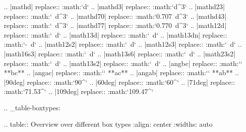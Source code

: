 .. |mathd| replace:: :math:`d`
.. |mathd3| replace:: :math:`d^{3}`
.. |mathd23| replace:: :math:`~d^{3}`
.. |mathd70| replace:: :math:`0.707~d^{3}`
.. |mathd43| replace:: :math:`~d^{3}`
.. |mathd77| replace:: :math:`0.770~d^{3}`
.. |math12d| replace:: :math:`~d`
.. |math13d| replace:: :math:`~d`
.. |math13dn| replace:: :math:`-~d`
.. |math12s2| replace:: :math:`~d`
.. |math12s3| replace:: :math:`~d`
.. |math16s3| replace:: :math:`~d`
.. |math13s6| replace:: :math:`~d`
.. |math23s2| replace:: :math:`~d`
.. |math13s2| replace:: :math:`~d`
.. |angbc| replace:: :math:`\angle` **bc** 
.. |angac| replace:: :math:`\angle` **ac** 
.. |angab| replace:: :math:`\angle` **ab** 
.. |90deg| replace:: :math:`90^\circ`
.. |60deg| replace:: :math:`60^\circ`
.. |71deg| replace:: :math:`71.53^\circ`
.. |109deg| replace:: :math:`109.47^\circ`

.. _table-boxtypes:

.. table:: Overview over different box types
    :align: center
    :widths: auto

